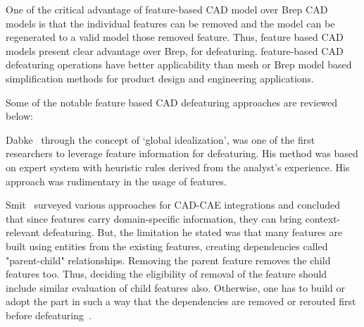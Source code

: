 One of the critical advantage of feature-based CAD model over Brep CAD models is that the individual features can be removed and the model can be regenerated to a valid model  those removed feature. Thus, feature based CAD models present clear advantage over Brep, for defeaturing.  feature-based CAD defeaturing operations have better applicability than mesh or Brep model based simplification methods for product design and engineering applications. 

Some of the notable feature based CAD defeaturing approaches are reviewed below:
 
Dabke~\cite{Dabke1994} through the concept of  `global idealization', was one of the first researchers to leverage feature information for defeaturing. His method was based on expert system with heuristic rules derived from the analyst's experience. His approach was  rudimentary in the usage of features.

	 
 Smit~\cite{Smit2009} surveyed various approaches for CAD-CAE integrations and concluded that since features carry domain-specific information, they can bring context-relevant defeaturing. But, the limitation he stated was that many features are built using entities from the existing features, creating dependencies called "parent-child" relationships. Removing the parent feature removes the child features too. Thus, deciding the eligibility of removal of the feature should include similar evaluation of child features also. Otherwise, one has to build or adopt the part in such a way that the dependencies are removed or rerouted first before defeaturing~\cite{AmesRiveraWebbHensinger1997}.

